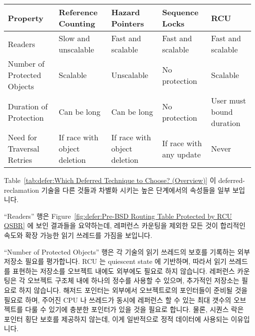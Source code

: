 \begin{table*}
\renewcommand*{\arraystretch}{1.25}
\footnotesize
\centering\OneColumnHSpace{-.3in}
\begin{tabularx}{5.3in}{>{\raggedright\arraybackslash}p{1.1in}
    >{\raggedright\arraybackslash}p{1.0in}
    >{\raggedright\arraybackslash}X
    >{\raggedright\arraybackslash}X
    >{\raggedright\arraybackslash}p{.9in}}
	\toprule
	Property
		& Reference Counting
			& Hazard Pointers
				& Sequence Locks
					& RCU \\
	\midrule
	Readers
		& Slow and unscalable
			& Fast and scalable
				& Fast and scalable
					& Fast and scalable \\
	Number of Protected Objects
		& Scalable
			& Unscalable
				& No protection
					& Scalable \\
	Duration of Protection
		& Can be long
			& Can be long
				& No protection
					& User must bound duration \\
	Need for Traversal Retries
		& If race with object deletion
			& If race with object deletion
				& If race with any update
					& Never \\
	\bottomrule
\end{tabularx}
\caption{Which Deferred Technique to Choose? (Overview)}
\label{tab:defer:Which Deferred Technique to Choose? (Overview)}
\end{table*}

Table~\ref{tab:defer:Which Deferred Technique to Choose? (Overview)}
이 deferred-reclamation 기술을 다른 것들과 차별화 시키는 높은 단계에서의
속성들을 일부 보입니다.

``Readers'' 행은
Figure~\ref{fig:defer:Pre-BSD Routing Table Protected by RCU QSBR}
에 보인 결과들을 요약하는데, 레퍼런스 카운팅을 제외한 모든 것이 합리적인 속도와
확장 가능한 읽기 쓰레드를 가짐을 보입니다.
\iffalse

Table~\ref{tab:defer:Which Deferred Technique to Choose? (Overview)}
shows a few high-level properties that distinguish the deferred-reclamation
techniques from one another.

The ``Readers'' row summarizes the results presented in
Figure~\ref{fig:defer:Pre-BSD Routing Table Protected by RCU QSBR},
which shows that all but reference counting are enjoy reasonably
fast and scalable readers.
\fi

``Number of Protected Objects'' 행은 각 기술의 읽기 쓰레드의 보호를 기록하는
외부 저장소 필요를 평가합니다.
RCU 는 quiescent state 에 기반하며, 따라서 읽기 쓰레드를 표현하는 저장소를
오브젝트 내에도 외부에도 필요로 하지 않습니다.
레퍼런스 카운팅은 각 오브젝트 구조체 내에 하나의 정수를 사용할 수 있으며,
추가적인 저장소는 필요로 하지 않습니다.
해저드 포인터는 외부에서 오브젝트로의 포인터들이 준비될 것을 필요로 하며,
주어진 CPU 나 쓰레드가 동시에 레퍼런스 할 수 있는 최대 갯수의 오브젝트를 다룰
수 있기에 충분한 포인터가 있을 것을 필요로 합니다.
물론, 시퀀스 락은 포인터 횡단 보호를 제공하지 않는데, 이게 일반적으로 정적
데이터에 사용되는 이유입니다.
\iffalse


